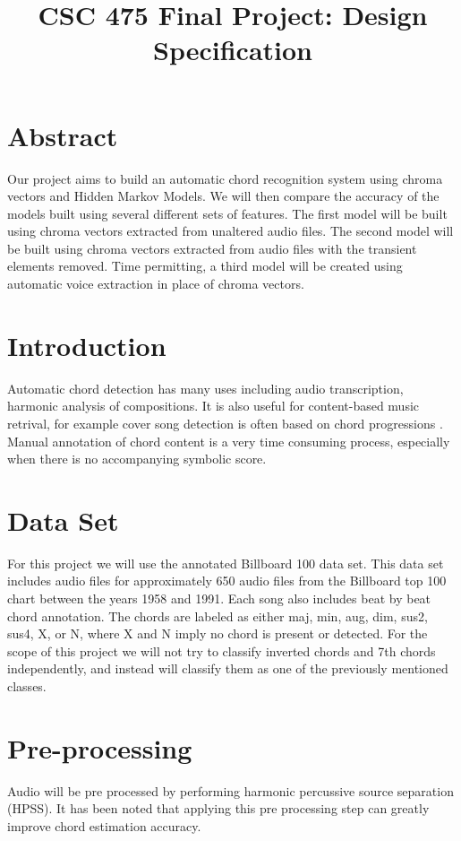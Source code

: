 \documentclass{article}
\title{CSC 475 Final Project: Design Specification}
\begin{document}
%
\maketitle
%

\section{Abstract}\label{sec:desoutline}
Our project aims to build an automatic chord recognition system using chroma
vectors and Hidden Markov Models. We will then compare the accuracy
of the models built using several different sets of features. The first model
will be built using chroma vectors extracted from unaltered audio files. The
second model will be built using chroma vectors extracted from audio files with
the transient elements removed. Time permitting, a third model will be created
using automatic voice extraction in place of chroma vectors.

\section{Introduction}\label{sec:intro}

Automatic chord detection has many uses including audio transcription, harmonic 
analysis of compositions. It is also useful for content-based music retrival, for
example cover song detection is often based on chord progressions \cite{Papadopoulos:18}. 
Manual annotation of chord content is a very time consuming process, especially when
there is no accompanying symbolic score.

\section{Data Set}

For this project we will use the annotated Billboard 100 data set. This data
set includes audio files for approximately 650 audio files from the Billboard
top 100 chart between the years 1958 and 1991. Each song also includes beat by
beat chord annotation\cite{Burgoyne:07}. The chords are labeled as either maj,
min, aug, dim, sus2, sus4, X, or N, where X and N imply no chord is present or detected.
For the scope of this project we will not try to classify inverted chords and
7th chords independently, and instead will classify them as one of the previously mentioned
classes.

\section{Pre-processing}
Audio will be pre processed by performing harmonic percussive source separation
(HPSS). It has been noted that applying this pre processing step can greatly
improve chord estimation accuracy\cite{Reed:09}.
\end{document}
